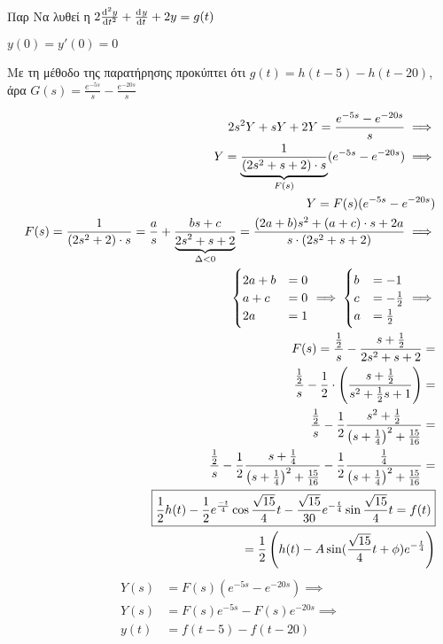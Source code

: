 \documentclass[11pt,a4paper,titlepage,final]{article}
\begin{document}
\begin{exercise*}{Παρ}
Να λυθεί η \(
2\od[2]{y}{t}+\od{y}{t}+2y = g(t)
\)

\(
y(0)=y'(0)=0
\)

\tcblower
Με τη μέθοδο της παρατήρησης προκύπτει ότι \( g(t) = h(t-5)-h(t-20) \), άρα \( G(s)= \frac{e^{-5s}}{s} - \frac{e^{-20s}}{s} \)

\begin{align*}
2s^2Y+sY+2Y = \frac{e^{-5s}-e^{-20s}}{s} \implies \\
Y = \underbrace{\frac{1}{(2s^2+s+2)\cdot s}}_{\mathclap{F(s)}}(e^{-5s}-e^{-20s}) \implies \\
Y = F(s) (e^{-5s}-e^{-20s}) \\
F(s) = \frac{1}{(2s^2+2)\cdot s} = \frac{a}{s}+\frac{bs+c}{\underbrace{2s^2+s+2}_{\mathclap{\Delta < 0}}} = \frac{(2a+b)s^2+(a+c)\cdot s+2a}{s \cdot (2s^2+s+2)} \implies \\
\begin{cases}
2a+b &= 0
\\ a+c &= 0
\\ 2a &= 1
\end{cases} \implies \begin{cases}
b &= -1 \\
c &= -\frac{1}{2} \\
a &= \frac{1}{2}
\end{cases} \implies \\
F(s) = \frac{\frac{1}{2}}{s} - \frac{s+\frac{1}{2}}{2s^2+s+2} = \\
\frac{\frac{1}{2}}{s}-\frac{1}{2}\cdot \left(
\frac{s+\frac{1}{2}}{s^2+\frac{1}{2}s+1}
\right) = \\
\frac{\frac{1}{2}}{s}-\frac{1}{2}\frac{s^2+\frac{1}{2}}{\left(s+\frac{1}{4} \right)^2+\frac{15}{16}} = \\
\frac{\frac{1}{2}}{s}-\frac{1}{2}\frac{s+\frac{1}{4}}{\left(s+\frac{1}{4} \right)^2+\frac{15}{16}} - \frac{1}{2}\frac{\frac{1}{4}}{\left(s+\frac{1}{4} \right)^2+\frac{15}{16}} = \\
\boxed{
	\frac{1}{2}h(t) - \frac{1}{2}e^\frac{-t}{4}\cos\frac{\sqrt{15}}{4}t - \frac{\sqrt{15}}{30}e^{-\frac{t}{4}}\sin\frac{\sqrt{15}}{4}t=f(t)
	} \\
	= \frac{1}{2} \left(
	h(t) - A\sin(\frac{\sqrt{15}}{4}t+\phi)e^{-\frac{t}{4}}
	\right)
\end{align*}
\begin{align*}
Y(s) &= F(s)(e^{-5s}-e^{-20s}) \implies \\
Y(s) &= F(s)e^{-5s}-F(s)e^{-20s} \implies \\
y(t) &= f(t-5) - f(t-20)
\end{align*}
\end{exercise*}
\end{document}
